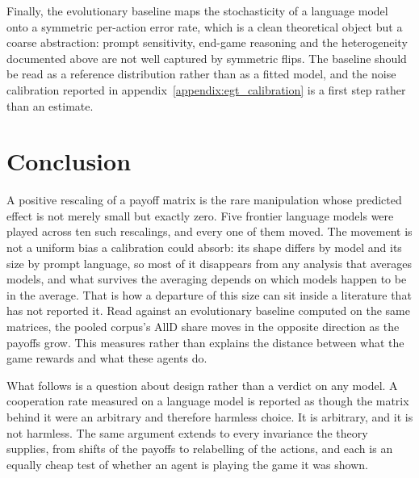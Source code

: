 \documentclass[openacc]{rsproca_new}
\begin{document}
Finally, the evolutionary baseline maps the stochasticity of a language model
onto a symmetric per-action error rate, which is a clean theoretical object but
a coarse abstraction: prompt sensitivity, end-game reasoning and the
heterogeneity documented above are not well captured by symmetric flips. The
baseline should be read as a reference distribution rather than as a fitted
model, and the noise calibration reported in
appendix~\ref{appendix:egt_calibration} is a first step rather than an
estimate.


\section{Conclusion}\label{sec:conclusion}

A positive rescaling of a payoff matrix is the rare manipulation whose
predicted effect is not merely small but exactly zero. Five frontier language
models were played across ten such rescalings, and every one of them moved. The
movement is not a uniform bias a calibration could absorb: its shape differs by
model and its size by prompt language, so most of it disappears from any
analysis that averages models, and what survives the averaging depends on which
models happen to be in the average. That is how a departure of this size can
sit inside a literature that has not reported it. Read against an evolutionary
baseline computed on the same matrices, the pooled corpus's AllD share moves in
the opposite direction as the payoffs grow. This measures rather than explains
the distance between what the game rewards and what these agents do.

What follows is a question about design rather than a verdict on any model. A
cooperation rate measured on a language model is reported as though the matrix
behind it were an arbitrary and therefore harmless choice. It is arbitrary, and
it is not harmless. The same argument extends to every invariance the theory
supplies, from shifts of the payoffs to relabelling of the actions, and each is
an equally cheap test of whether an agent is playing the game it was shown.




\end{document}
